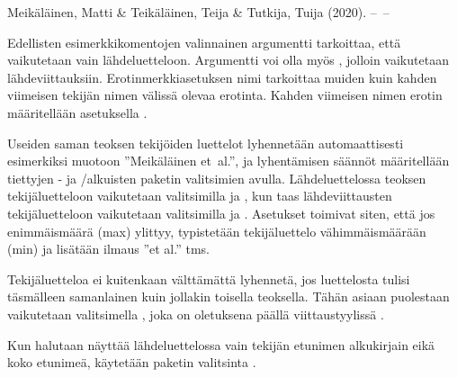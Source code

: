 
\begin{koodilohkosis}
\end{koodilohkosis}

\begin{tulossis}
  Meikäläinen, Matti \& Teikäläinen, Teija \& Tutkija, Tuija (2020).
  --~--
\end{tulossis}

Edellisten esimerkkikomentojen valinnainen argumentti 
tarkoittaa, että vaikutetaan vain lähdeluetteloon. Argumentti voi olla
myös \mbox{}, jolloin vaikutetaan lähdeviittauksiin.
Ero\-tin\-merkki\-ase\-tuk\-sen nimi 
tarkoittaa muiden kuin kahden viimeisen tekijän nimen välissä olevaa
erotinta. Kahden viimeisen nimen erotin määritellään asetuksella
.

Useiden saman teoksen tekijöiden luettelot lyhennetään automaattisesti
esimerkiksi muotoon ''Meikäläinen et~al.'', ja lyhentämisen säännöt
määritellään tiettyjen - ja \-/alkuisten paketin
valitsimien avulla. Lähdeluettelossa teoksen tekijäluetteloon
vaikutetaan valitsimilla  ja
, kun taas lähdeviittausten tekijäluetteloon
vaikutetaan valitsimilla  ja
. Asetukset toimivat siten, että jos
enimmäismäärä (max) ylittyy, typistetään tekijäluettelo vähimmäismäärään
(min) ja lisätään ilmaus ''et al.'' tms.

Tekijäluetteloa ei kuitenkaan välttämättä lyhennetä, jos luettelosta
tulisi täsmälleen samanlainen kuin jollakin toisella teoksella. Tähän
asiaan puolestaan vaikutetaan valitsimella , joka on
oletuksena päällä viittaustyylissä .

\begin{koodilohkosis}
  \usepackage[style=authoryear, maxbibnames=99, minbibnames=3,
    maxcitenames=3, mincitenames=1, uniquelist=true]{biblatex}
\end{koodilohkosis}

Kun halutaan näyttää lähdeluettelossa vain tekijän etunimen alkukirjain
eikä koko etunimeä, käytetään paketin valitsinta .


\begin{koodilohkosis}
  \usepackage[…, giveninits]{biblatex}
\end{koodilohkosis}

